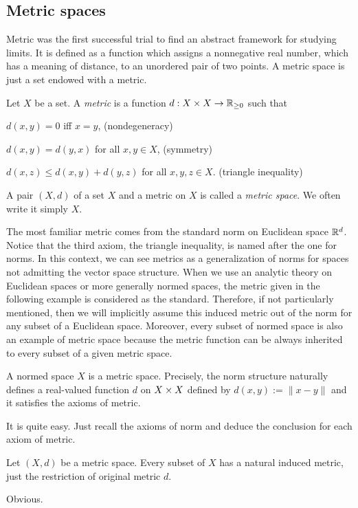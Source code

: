 \documentclass{../crs}
\begin{document}
\subsection{Metric spaces}

Metric was the first successful trial to find an abstract framework for studying limits.
It is defined as a function which assigns a nonnegative real number, which has a meaning of distance, to an unordered pair of two points.
A metric space is just a set endowed with a metric.

\begin{defn}
Let $X$ be a set.
A \emph{metric} is a function $d:X\x X\to\R_{\ge0}$ such that
\begin{cond}
\item $d(x,y)=0$ iff $x=y$, \hfill(nondegeneracy)
\item $d(x,y)=d(y,x)$ for all $x,y\in X$, \hfill(symmetry)
\item $d(x,z)\le d(x,y)+d(y,z)$ for all $x,y,z\in X$. \hfill(triangle inequality)
\end{cond}
A pair $(X,d)$ of a set $X$ and a metric on $X$ is called a \emph{metric space}.
We often write it simply $X$.
\end{defn}

The most familiar metric comes from the standard norm on Euclidean space $\mathbb{R}^d$.
Notice that the third axiom, the triangle inequality, is named after the one for norms.
In this context, we can see metrics as a generalization of norms for spaces not admitting the vector space structure.
When we use an analytic theory on Euclidean spaces or more generally normed spaces, the metric given in the following example is considered as the standard.
Therefore, if not particularly mentioned, then we will implicitly assume this induced metric out of the norm for any subset of a Euclidean space.
Moreover, every subset of normed space is also an example of metric space because the metric function can be always inherited to every subset of a given metric space.

\begin{ex}
A normed space $X$ is a metric space.
Precisely, the norm structure naturally defines a real-valued function $d$ on $X\times X$ defined by $d(x,y):=\|x-y\|$ and it satisfies the axioms of metric.
\end{ex}
\begin{pf}
It is quite easy.
Just recall the axioms of norm and deduce the conclusion for each axiom of metric.
\end{pf}
\begin{ex}
Let $(X,d)$ be a metric space.
Every subset of $X$ has a natural induced metric, just the restriction of original metric $d$.
\end{ex}
\begin{pf}
Obvious.
\end{pf}
\end{document}
